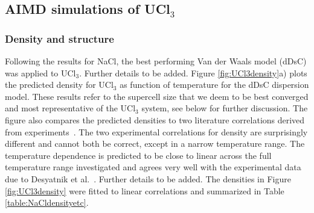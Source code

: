 \documentclass[preprint,3p,10pt,twocolumn,number,sort&compress]{elsarticle}
\begin{document}


\subsection{AIMD simulations of UCl$_3$}
\subsubsection{Density and structure}
Following the results for NaCl, the best performing Van der Waals model (dDsC) was applied to UCl$_3$. {\color{red} Further details to be added.}%
Figure \ref{fig:UCl3density}a) plots the predicted density for UCl$_3$ as function of temperature for the dDsC dispersion model. 
These results refer to the supercell size that we deem to be best converged and most representative of the UCl$_3$ system, see below for further discussion. 
The figure also compares the predicted densities to two literature correlations derived from experiments~\cite{Janz1988,Desyatnik}.
The two experimental correlations for density are surprisingly different and cannot both be correct, except in a narrow temperature range. 
 The temperature dependence is predicted to be close to linear across the full temperature range investigated and agrees very well with the experimental data due to Desyatnik et al.~\cite{Desyatnik}.  {\color{red}Further details to be added.} %
 The densities in Figure \ref{fig:UCl3density} were fitted to linear correlations and summarized in Table \ref{table:NaCldensityetc}. 
 
\end{document}
